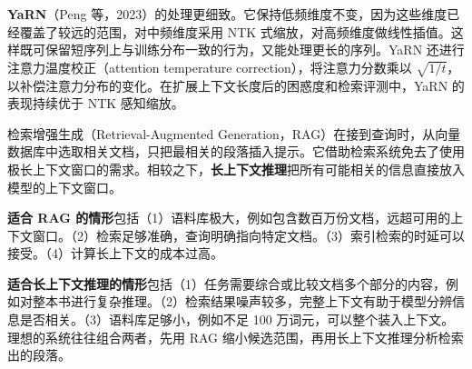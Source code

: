 \begin{interview}
\textbf{YaRN}（Peng 等，2023）的处理更细致。它保持低频维度不变，因为这些维度已经覆盖了较远的范围，对中频维度采用 NTK 式缩放，对高频维度做线性插值。这样既可保留短序列上与训练分布一致的行为，又能处理更长的序列。YaRN 还进行注意力温度校正（attention temperature correction），将注意力分数乘以 \(\sqrt{1/t}\)，以补偿注意力分布的变化。在扩展上下文长度后的困惑度和检索评测中，YaRN 的表现持续优于 NTK 感知缩放。

检索增强生成（Retrieval-Augmented Generation，RAG）在接到查询时，从向量数据库中选取相关文档，只把最相关的段落插入提示。它借助检索系统免去了使用极长上下文窗口的需求。相较之下，\textbf{长上下文推理}把所有可能相关的信息直接放入模型的上下文窗口。

\textbf{适合 RAG 的情形}包括（1）语料库极大，例如包含数百万份文档，远超可用的上下文窗口。（2）检索足够准确，查询明确指向特定文档。（3）索引检索的时延可以接受。（4）计算长上下文的成本过高。

\textbf{适合长上下文推理的情形}包括（1）任务需要综合或比较文档多个部分的内容，例如对整本书进行复杂推理。（2）检索结果噪声较多，完整上下文有助于模型分辨信息是否相关。（3）语料库足够小，例如不足 100 万词元，可以整个装入上下文。理想的系统往往组合两者，先用 RAG 缩小候选范围，再用长上下文推理分析检索出的段落。
\end{interview}
